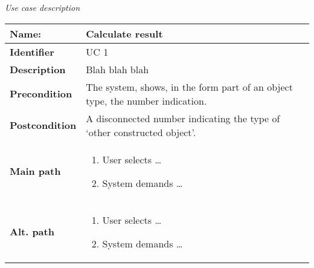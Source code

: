 \documentclass{article}
\newcommand\addrow[2]{#1 &#2\\ }
\newcommand\addheading[2]{#1 &#2\\ \hline}
\newcommand\tabularhead{\begin{tabular}{lp{10cm}}
\hline
}
\newcommand\addmulrow[2]{ \begin{minipage}[t][][t]{2.5cm}#1\end{minipage}%
   &\begin{minipage}[t][][t]{10cm}
    \begin{enumerate} #2   \end{enumerate}
    \end{minipage}\\ }
\newenvironment{usecase}{\tabularhead}
{\hline\end{tabular}}
\begin{document}
{\Large\textit{Use case description}} \\
\begin{usecase}
  \addheading{\textbf{Name:}}{Calculate result}
  \addheading{\textbf{Identifier}}{UC 1}
  \addrow{\textbf{Description}}{Blah blah blah}
  \addrow{\textbf{Precondition}}{The system, shows, in the form part of an object type, the number   indication.}
  \addrow{\textbf{Postcondition}}{A disconnected number indicating the type of `other constructed object'.}
  \addmulrow{\textbf{Main path}}{
  	\item User selects \ldots
    \item System demands \ldots}
  \addmulrow{\textbf{Alt. path}}{
  	\item User selects \ldots
    \item System demands \ldots}
\end{usecase}
\end{document}
